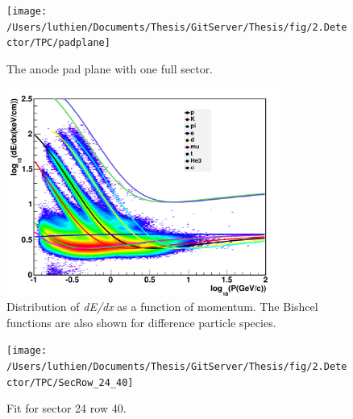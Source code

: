 \begin{figure}
\begin{centering}
\texttt{[image: /Users/luthien/Documents/Thesis/GitServer/Thesis/fig/2.Detector/TPC/padplane]}
\par\end{centering}

\protect\caption{The anode pad plane with one full sector.}


\label{fig:pad_plane}
\end{figure}


\begin{figure}
\begin{centering}
\includegraphics[width=0.8\textwidth]{fig/2.Detector/TPC/dEdx}
\par\end{centering}

\protect\caption{Distribution of \emph{dE/dx} as a function of momentum. The Bishcel
functions are also shown for difference particle species.}


\label{fig:dEdx_Bichsel}
\end{figure}


\begin{figure}
\begin{centering}
\texttt{[image: /Users/luthien/Documents/Thesis/GitServer/Thesis/fig/2.Detector/TPC/SecRow\_24\_40]}
\par\end{centering}

\protect\caption{Fit for sector 24 row 40.}


\label{fig:SecRow_24_40}
\end{figure}


